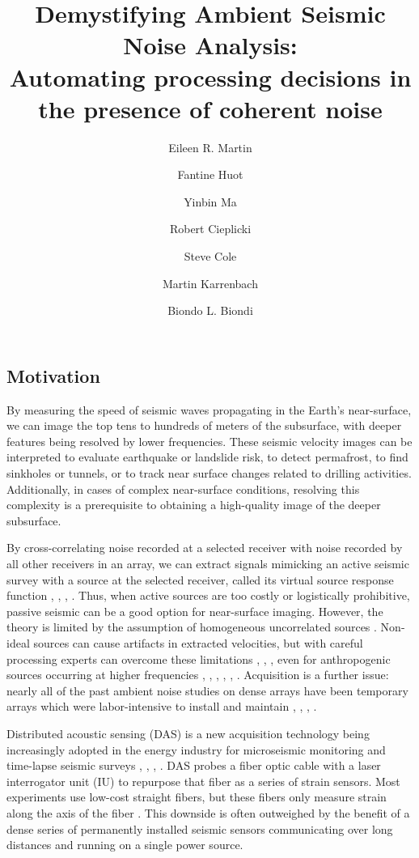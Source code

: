 \documentclass[11pt]{article}
\title{\vspace{-1.8cm} \Large Demystifying Ambient Seismic Noise Analysis: \\Automating processing decisions in the presence of coherent noise \vspace{-0.5cm}}
\author[1,2]{\small Eileen R. Martin}
\author[2]{Fantine Huot}
\author[1]{Yinbin Ma}
\author[2]{Robert Cieplicki}
\author[3]{Steve Cole}
\author[3]{Martin Karrenbach}
\author[2,1]{Biondo L. Biondi \vspace{-0.4cm}}
\affil[1]{Institute for Computational and Mathematical Engineering, Stanford University, Stanford, CA}
\affil[2]{Department of Geophysics, Stanford University, Stanford, CA}
\affil[3]{OptaSense, Brea, CA}
\date{}
\begin{document}
\maketitle

\vspace{-1.8cm}
\subsection*{Motivation} 
\vspace{-0.2cm}
By measuring the speed of seismic waves propagating in the Earth's near-surface, we can image the top tens to hundreds of meters of the subsurface, with deeper features being resolved by lower frequencies. These seismic velocity images can be interpreted to evaluate earthquake or landslide risk, to detect permafrost, to find sinkholes or tunnels, or to track near surface changes related to drilling activities. Additionally, in cases of complex near-surface conditions, resolving this complexity is a prerequisite to obtaining a high-quality image of the deeper subsurface.
\par
By cross-correlating noise recorded at a selected receiver with noise recorded by all other receivers in an array, we can extract signals mimicking an active seismic survey with a source at the selected receiver, called its virtual source response function \cite{Lobkis2001}, \cite{Lin2008}, \cite{Wapenaar2010A}, \cite{Wapenaar2010B}. Thus, when active sources are too costly or logistically prohibitive, passive seismic can be a good option for near-surface imaging. However, the theory is limited by the assumption of homogeneous uncorrelated sources \cite{Wapenaar2010A}. Non-ideal sources can cause artifacts in extracted velocities, but with careful processing experts can overcome these limitations \cite{Bensen2007}, \cite{Daskalakis2016}, \cite{Zhan2013}, even for anthropogenic sources occurring at higher frequencies \cite{Girard2016}, \cite{Martin2015}, \cite{Martin2016}, \cite{Nakata2011}, \cite{Nakata2015}, \cite{Zeng2017}. Acquisition is a further issue: nearly all of the past ambient noise studies on dense arrays have been temporary arrays which were labor-intensive to install and maintain \cite{Lin2008}, \cite{Nakata2011}, \cite{Nakata2015}, \cite{Zeng2017}. 
\par
Distributed acoustic sensing (DAS) is a new acquisition technology being increasingly adopted in the energy industry for microseismic monitoring \cite{Webster2013} and time-lapse seismic surveys \cite{Daley2013}, \cite{Mateeva2014}, \cite{Bakku2015}, \cite{Miller2016}. DAS probes a fiber optic cable with a laser interrogator unit (IU) to repurpose that fiber as a series of strain sensors. Most experiments use low-cost straight fibers, but these fibers only measure strain along the axis of the fiber \cite{Kuvshinov2016}. This downside is often outweighed by the benefit of a dense series of permanently installed seismic sensors communicating over long distances and running on a single power source.
\end{document}
